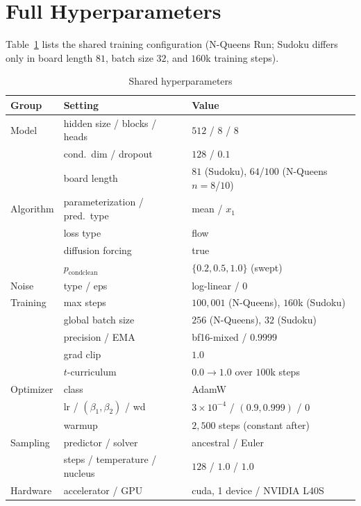 \documentclass{article}
\begin{document}



\appendix
\section{Full Hyperparameters}
\label{app:hyperparams}
Table~\ref{tab:hparams} lists the shared training configuration (N-Queens Run; Sudoku differs only
in board length $81$, batch size $32$, and $160$k training steps).

\begin{table}[h]
\centering
\caption{Shared hyperparameters}
\label{tab:hparams}
\begin{tabular}{lll}
\toprule
Group & Setting & Value \\
\midrule
Model & hidden size / blocks / heads & $512$ / $8$ / $8$ \\
      & cond.\ dim / dropout & $128$ / $0.1$ \\
      & board length & $81$ (Sudoku), $64$/$100$ (N-Queens $n{=}8$/$10$) \\
Algorithm & parameterization / pred.\ type & mean / $x_1$ \\
          & loss type & flow \\
          & diffusion forcing & true \\
          & $p_\text{condclean}$ & $\{0.2,0.5,1.0\}$ (swept) \\
Noise & type / eps & log-linear / $0$ \\
Training & max steps & $100{,}001$ (N-Queens), $160$k (Sudoku) \\
         & global batch size & $256$ (N-Queens), $32$ (Sudoku) \\
         & precision / EMA & bf16-mixed / $0.9999$ \\
         & grad clip & $1.0$ \\
         & $t$-curriculum & $0.0\to1.0$ over $100$k steps \\
Optimizer & class & AdamW \\
          & lr / $(\beta_1,\beta_2)$ / wd & $3\!\times\!10^{-4}$ / $(0.9,0.999)$ / $0$ \\
          & warmup & $2{,}500$ steps (constant after) \\
Sampling & predictor / solver & ancestral / Euler \\
         & steps / temperature / nucleus & $128$ / $1.0$ / $1.0$ \\
Hardware & accelerator / GPU & cuda, 1 device / NVIDIA L40S \\
\bottomrule
\end{tabular}
\end{table}
\end{document}
